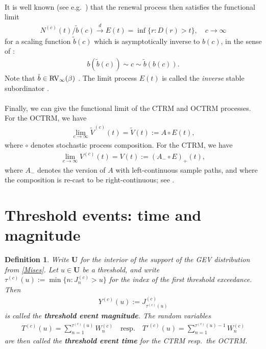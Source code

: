 \documentclass[12pt, a4paper]{article}
\newtheorem{definition}[equation]{Definition}
\newcommand{\1}{\mathbf 1}
\newcommand{\cd}{\overset{d}{\longrightarrow}}
\begin{document}
\paragraph{}
It is well known (see e.g.\ \cite{limitCTRW}) that the renewal
process then satisfies the functional limit
\begin{align}
N^{(c)}(t)/\tilde b(c) \cd E(t) = \inf\{r: D(r) > t\}, 
\quad c \to \infty
\end{align}
for a scaling function $\tilde b(c)$ which is 
asymptotically inverse to $b(c)$, in the sense
of \cite[p.20]{seneta}: 
\begin{align}\label{eq:tildeb}
b(\tilde b(c)) \sim c \sim \tilde b(b(c)).
\end{align}
Note that $\tilde b \in {\rm RV}_\infty(\beta)$ 
\cite{limitCTRW}.
The limit process $E(t)$ is called the \emph{inverse} stable
subordinator \cite{invSubord}.

\paragraph{}
Finally, we can give the functional limit of the CTRM and OCTRM processes. 
For the OCTRM, we have 
\begin{align}
  \lim \limits_{c \to \infty} \tilde V^{(c)}(t) = \tilde V(t) 
  := A \circ E(t),
\end{align}
where $\circ$ denotes stochastic process composition. For the CTRM, we have 
\begin{align}
\lim \limits_{c \to \infty} V^{(c)}(t) = V(t) 
:= (A_- \circ E)_+(t),
\end{align}
where $A_-$ denotes the version of $A$ with left-continuous sample paths, and 
where the composition is re-cast to be right-continuous; see \cite{Hees17}. 


\section{Threshold events: time and magnitude}

\begin{definition}
Write $\mathbf U$ for the interior of the support of the GEV distribution from 
\eqref{Mises}. 
Let $u \in \mathbf U$ be a threshold, and write 
$
\tau^{(c)}(u) := \min\{n: J^{(c)}_n > u\}
$
for the index of the first threshold exceedance. 
Then
\begin{align*}
  Y^{(c)}(u) := J^{(c)}_{\tau^{(c)}(u)}
\end{align*}
is called the \textbf{threshold event magnitude}. The random variables 
\begin{align}
  T^{(c)}(u) = \sum_{n=1}^{\tau^{(c)}(u)} W^{(c)}_n \quad \text{resp.} \quad 
  T'^{(c)}(u) = \sum_{n=1}^{\tau^{(c)}(u)-1} W^{(c)}_n
\end{align}
are then called the \textbf{threshold event time} for the CTRM resp.\ the 
OCTRM. 
\end{definition}
\end{document}
